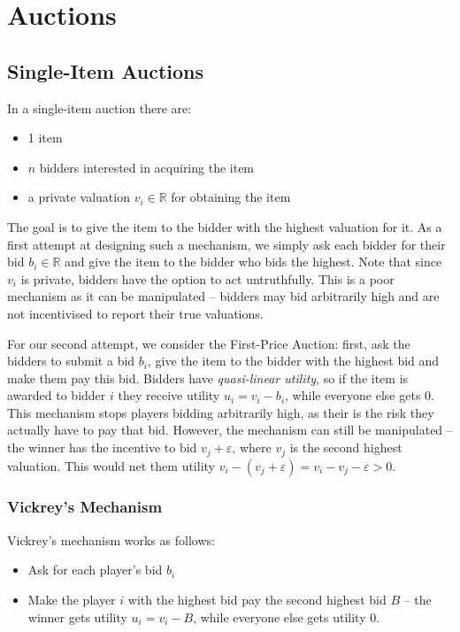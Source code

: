 \section{Auctions}

\subsection{Single-Item Auctions}

In a single-item auction there are:

\begin{itemize}
	\itemsep0em 
	\item 1 item
	\item $n$ bidders interested in acquiring the item
	\item a private valuation $v_i \in \mathbb{R}$ for obtaining the item
\end{itemize}

The goal is to give the item to the bidder with the highest valuation for it.
As a first attempt at designing such a mechanism, we simply ask each bidder for
their bid $b_i \in \mathbb{R}$ and give the item to the bidder who bids the
highest. Note that since $v_i$ is private, bidders have the option to act
untruthfully. This is a poor mechanism as it can be manipulated -- bidders may
bid arbitrarily high and are not incentivised to report their true valuations.

For our second attempt, we consider the First-Price Auction: first, ask the
bidders to submit a bid $b_i$, give the item to the bidder with the highest bid
and make them pay this bid. Bidders have \emph{quasi-linear utility}, so if the
item is awarded to bidder $i$ they receive utility $u_i = v_i - b_i$, while
everyone else gets 0. This mechanism stops players bidding arbitrarily high, as
their is the risk they actually have to pay that bid.  However, the mechanism
can still be manipulated -- the winner has the incentive to bid $v_j +
\varepsilon$, where $v_j$ is the second highest valuation. This would net them
utility $v_i - (v_j + \varepsilon) = v_i - v_j - \varepsilon > 0$.

\subsubsection{Vickrey's Mechanism}

Vickrey's mechanism works as follows:

\begin{itemize}
	\itemsep0em
	\item Ask for each player's bid $b_i$
	\item Make the player $i$ with the highest bid pay the second
		highest bid $B$ -- the winner gets utility $u_i = v_i - B$,
		while everyone else gets utility 0.
\end{itemize}

